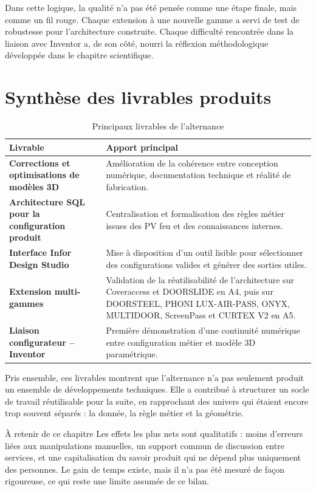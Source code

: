 Dans cette logique, la qualité n'a pas été pensée comme une étape finale, mais comme un fil rouge. Chaque extension à une nouvelle gamme a servi de test de robustesse pour l'architecture construite. Chaque difficulté rencontrée dans la liaison avec Inventor a, de son côté, nourri la réflexion méthodologique développée dans le chapitre scientifique.

\section{Synthèse des livrables produits}

\begin{table}[H]
\centering
\caption{Principaux livrables de l'alternance}
\begin{tabularx}{\textwidth}{>{\bfseries}p{}X}
\toprule
Livrable & Apport principal \\
\midrule
Corrections et optimisations de modèles 3D & Amélioration de la cohérence entre conception numérique, documentation technique et réalité de fabrication. \\
Architecture SQL pour la configuration produit & Centralisation et formalisation des règles métier issues des PV feu et des connaissances internes. \\
Interface Infor Design Studio & Mise à disposition d'un outil lisible pour sélectionner des configurations valides et générer des sorties utiles. \\
Extension multi-gammes & Validation de la réutilisabilité de l'architecture sur Coveraccess et DOORSLIDE en A4, puis sur DOORSTEEL, PHONI LUX-AIR-PASS, ONYX, MULTIDOOR, ScreenPass et CURTEX V2 en A5. \\
Liaison configurateur -- Inventor & Première démonstration d'une continuité numérique entre configuration métier et modèle 3D paramétrique. \\
\bottomrule
\end{tabularx}
\end{table}

Pris ensemble, ces livrables montrent que l'alternance n'a pas seulement produit un ensemble de développements techniques. Elle a contribué à structurer un socle de travail réutilisable pour la suite, en rapprochant des univers qui étaient encore trop souvent séparés : la donnée, la règle métier et la géométrie.

\begin{encadretitre}{À retenir de ce chapitre}
Les effets les plus nets sont qualitatifs : moins d'erreurs liées aux manipulations manuelles, un support commun de discussion entre services, et une capitalisation du savoir produit qui ne dépend plus uniquement des personnes. Le gain de temps existe, mais il n'a pas été mesuré de façon rigoureuse, ce qui reste une limite assumée de ce bilan.
\end{encadretitre}
